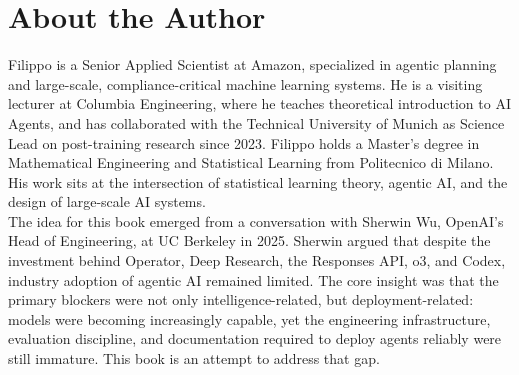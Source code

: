 \chapter*{About the Author}

Filippo is a Senior Applied Scientist at Amazon, specialized in agentic planning and
large-scale, compliance-critical machine learning systems. He is a visiting lecturer at
Columbia Engineering, where he teaches theoretical introduction to AI Agents, and has collaborated
with the Technical University of Munich as Science Lead on post-training research since
2023. Filippo holds a Master's degree in Mathematical Engineering and Statistical
Learning from Politecnico di Milano. His work sits at the intersection of statistical
learning theory, agentic AI, and the design of large-scale AI systems. \\

The idea for this book emerged from a conversation with Sherwin Wu,
OpenAI's Head of Engineering, at UC Berkeley in 2025. Sherwin argued that despite the
investment behind Operator, Deep Research, the Responses API, o3, and Codex, industry
adoption of agentic AI remained limited. The core insight was that the primary blockers
were not only intelligence-related, but deployment-related: models were becoming
increasingly capable, yet the engineering infrastructure, evaluation discipline, and
documentation required to deploy agents reliably were still immature. This book is an attempt to address that gap.